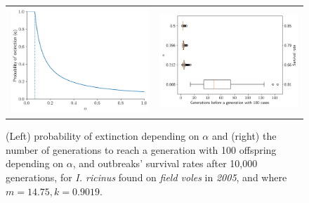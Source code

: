 \documentclass{article}
\begin{document}
\begin{figure}[]
	\begin{mdframed}[backgroundcolor=grey250,rightline=false,leftline=false,topline=false]
		\centering
		\begin{tabular}{ll}
			\includegraphics[width=.46\linewidth,valign=m]{extinctionProbability2005_I. ricinus_FV} & \includegraphics[width=.50\linewidth,valign=m]{firstGeneration100_2005_I. ricinus_FV}
		\end{tabular}
		\caption{(Left) probability of extinction depending on $ \alpha $ and (right) the number of generations to reach a generation with 100 offspring depending on $ \alpha $, and  outbreaks' survival rates after 10,000 generations, for \textit{I. ricinus} found on \textit{field voles} in \textit{2005}, and where $ m = 14.75, k = 0.9019 $.}
		\label{fig:simulation_2005_iricinus_FV}
	\end{mdframed}
\end{figure}
\end{document}
